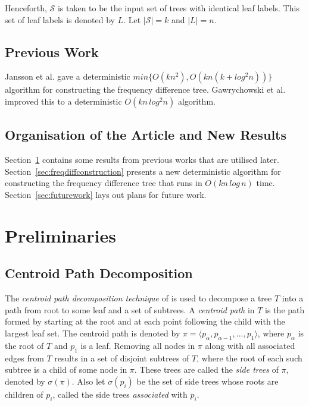 \documentclass{article}
\begin{document}
    Henceforth, $\mathcal{S}$ is taken to be the input set of trees with identical leaf labels. This set of leaf labels is denoted by $L$. Let $|\mathcal{S}| = k$ and $|L| = n$.

    \subsection{Previous Work}
    Jansson et al. \cite{jansson2018algorithms} gave a deterministic $min\{O(kn^2), O(kn(k + log^2 n))\}$ algorithm for constructing the frequency difference tree. Gawrychowski et al. \cite{gawrychowski2017faster} improved this to a deterministic $O(kn\,log^2n)$ algorithm.

    \subsection{Organisation of the Article and New Results}
    Section~\ref{sec:preliminaries} contains some results from previous works that are utilised later. Section~\ref{sec:freqdiffconstruction} presents a new deterministic algorithm for constructing the frequency difference tree that runs in $O(kn\,log\,n)$ time. Section~\ref{sec:futurework} lays out plans for future work.

    \section{Preliminaries}
    \label{sec:preliminaries}

    \subsection{Centroid Path Decomposition}

    The \textit{centroid path decomposition technique} of \cite{cole2000n} is used to decompose a tree $T$ into a path from root to some leaf and a set of subtrees. A \textit{centroid path} in $T$ is the path formed by starting at the root and at each point following the child with the largest leaf set. The centroid path is denoted by $\pi = \langle p_{\alpha}, p_{\alpha - 1}, ..., p_1 \rangle$, where $p_{\alpha}$ is the root of $T$ and $p_1$ is a leaf. Removing all nodes in $\pi$ along with all associated edges from $T$ results in a set of disjoint subtrees of $T$, where the root of each such subtree is a child of some node in $\pi$. These trees are called the \textit{side trees} of $\pi$, denoted by $\sigma(\pi)$. Also let $\sigma(p_i)$ be the set of side trees whose roots are children of $p_i$, called the side trees \textit{associated} with $p_i$.
\end{document}

